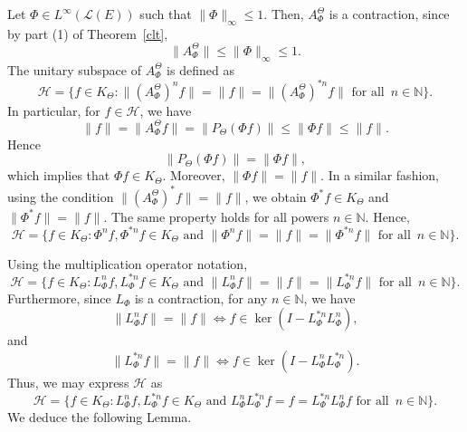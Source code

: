 \documentclass{amsart}
\theoremstyle{definition}
\newcommand{\h}{\mathcal{\mathcal H}}
\begin{document}


Let $\Phi \in L^{\infty}(\mathcal{L}(E))$ such that $\|\Phi\|_{\infty} \leq 1$. Then, $A^{\Theta}_{\Phi}$ is a contraction, since by part (1) of Theorem~\ref{clt}, 
\[
\|A^{\Theta}_{\Phi} \| \leq \|\Phi\|_{\infty} \leq 1.
\]
The unitary subspace of $A^{\Theta}_{\Phi}$ is defined as
\[
\mathcal{H} = \{f \in K_\Theta: \|(A^{\Theta}_{\Phi})^n f\| = \|f\| = \|(A^{\Theta}_{\Phi})^{*n} f\| \text{ for all }\, n \in \mathbb{N} \}.
\]
In particular, for $f \in \h$, we have
\[
\|f\| = \|A^{\Theta}_{\Phi}f\| = \|P_{\Theta} (\Phi f) \| \leq \|\Phi f \| \leq \|f\|.
\]
Hence
\[
\|P_{\Theta} (\Phi f) \| = \|\Phi f \|,
\]
which implies that $\Phi f \in K_\Theta$.  Moreover, $\|\Phi f\| = \|f \|$. In a similar fashion, using the condition $\|(A^{\Theta}_{\Phi})^{*}f \| = \|f\|$,  we obtain  $\Phi^* f \in K_\Theta$ and $\|\Phi^* f\| = \|f \|$. The same property holds for all powers $n \in \mathbb{N}$. Hence,
\[
\mathcal{H} = \{f \in K_\Theta: \Phi^{n} f, \Phi^{*n} f \in K_\Theta \text{ and } \|\Phi^n f\| = \|f\| = \|\Phi^{*n} f\| \text{ for all }\, n \in \mathbb{N} \}.
\]


\noindent Using the multiplication operator notation,
\[
\mathcal{H} = \{f \in K_\Theta: L_{\Phi}^n f, L_{\Phi}^{*n} f \in K_\Theta \text{ and } \|L_{\Phi}^n f\| = \|f\| = \|L_{\Phi}^{*n} f\| \text{ for all }\, n \in \mathbb{N} \}.
\]
 Furthermore, since $L_{\Phi}$ is a contraction, for any $n \in \mathbb{N}$, we have
 \[
\|L_{\Phi}^n f \| = \|f\| \Longleftrightarrow f \in  \ker (I - L_{\Phi}^{*n} L_{\Phi}^{n}),
\]
and
\[
\|L_{\Phi}^{*n} f \| = \|f\| \Longleftrightarrow f \in  \ker (I - L_{\Phi}^{n} L_{\Phi}^{*n}).
\]
Thus, we may express $\h$ as
\begin{equation}
\mathcal{H} = \{f \in K_\Theta: L_{\Phi}^n f, L_{\Phi}^{*n} f \in K_\Theta \text{ and } L_{\Phi}^n L_{\Phi}^{*n} f = f = L_{\Phi}^{*n} L_{\Phi}^n f \text{ for all }\, n \in \mathbb{N} \}.\label{calHform}\end{equation}
We deduce the following Lemma.
\medskip
\end{document}
